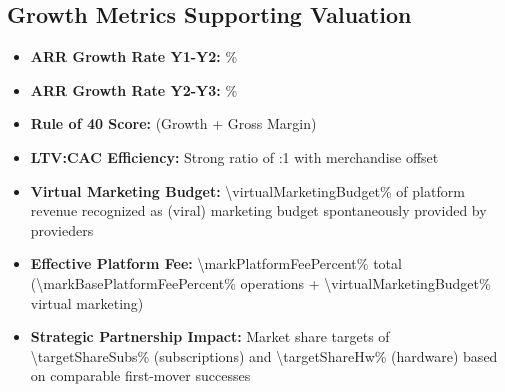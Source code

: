 \subsection{Growth Metrics Supporting Valuation}
\begin{itemize}
    \item \textbf{ARR Growth Rate Y1-Y2:} \%
    \item \textbf{ARR Growth Rate Y2-Y3:} \%
    \item \textbf{Rule of 40 Score:}  (Growth + Gross Margin)
    \item \textbf{LTV:CAC Efficiency:} Strong ratio of \numint{\subLTV/(\cacDigital - \merchOffsetSubsCalc)}:1 with merchandise offset
    \item \textbf{Virtual Marketing Budget:} \num{\virtualMarketingBudget}\% of platform revenue recognized as (viral) marketing budget spontaneously provided by provieders
    \item \textbf{Effective Platform Fee:} \num{\markPlatformFeePercent}\% total (\num{\markBasePlatformFeePercent}\% operations + \num{\virtualMarketingBudget}\% virtual marketing)
    \item \textbf{Strategic Partnership Impact:} Market share targets of \num{\targetShareSubs}\% (subscriptions) and \num{\targetShareHw}\% (hardware) based on comparable first-mover successes
\end{itemize}

